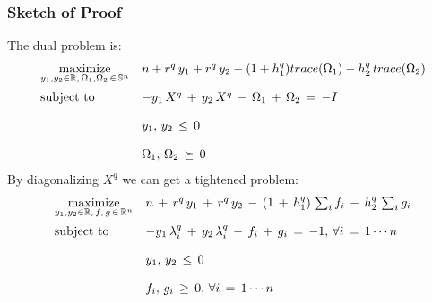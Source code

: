 \documentclass{beamer}
\newcommand{\tblue}{\textcolor{blue}}
\newcommand{\tmag}{\textcolor{magenta}}
\begin{document}
\begin{frame}
\frametitle{Sketch of Proof}
The dual problem is:
\begin{equation*} 
\begin{array}{ll}
\displaystyle{
{\operatornamewithlimits{\mbox{maximize}}_{y_1,y_2\in \mathbb{R},\,\Omega_1, \Omega_2 \, \in \, \mathbb{S}^n}}
} &n+r^q\,y_1+r^q\,y_2-(1+h_1^q)trace(\Omega_1)-h_2^q\,trace(\Omega_2)\\ [0.15in]
\mbox{subject to}%
& -y_1\,X^q\,+\,y_2\,X^q\,-\,\Omega_1\,+\,\Omega_2\,=\,-I\\[0.15in]
&y_1,\,y_2\,\leq\,0\\[0.15in]
&\Omega_1,\,\Omega_2\,\succeq\,0
\end{array}
\end{equation*}
By diagonalizing $X^q$ we can get a tightened problem:
\begin{equation*} \label{TXFixedPSDPerturbedDual}
\begin{array}{ll}
\displaystyle{
{\operatornamewithlimits{\mbox{maximize}}_{y_1,y_2\in \mathbb{R},\,f,\,g \, \in \, \mathbb{R}^n}}
} &n\,+\,r^q\,y_1\,+\,r^q\,y_2\,-\,(1\,+\,h_1^q)\,\sum_i f_i \,-\,h_2^q\,\sum_i g_i\\ [0.15in]
\mbox{subject to}%
& -y_1\,\lambda_i^q\,+\,y_2\,\lambda_i^q\,-\,f_i\,+\,g_i\,=\,-1,\,\forall i\,=\,1\cdots n\\[0.15in]
&y_1,\,y_2\,\leq\,0\\[0.15in]
&f_i,\,g_i\,\geq\,0,\,\forall i\,=\,1\cdots n
\end{array}
\end{equation*}
\end{frame}
%
%
\end{document}
